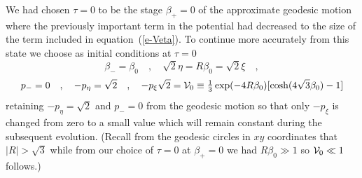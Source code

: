 We had chosen $\tau=0$ to be the stage $\beta_+ = 0$ of the
approximate geodesic motion where the previously important term in the
potential had decreased to the size of the term included in
equation~(\ref{e-Veta}).  To continue more accurately from this state
we choose as initial conditions at $\tau = 0$
$$
   \beta_- = \beta_0 \quad , \quad
   \sqrt{2}\eta = R\beta_0  =  \sqrt{2}\xi  \quad ,
$$
\begin{equation}
   p_- = 0 \quad , \quad -p_\eta = \sqrt{2} \quad , \quad
   -p_\xi \sqrt{2} = {\cal V}_0 \equiv \mbox{$\frac{1}{3}$}
            \exp(-4R\beta_0) [\cosh(4\sqrt{3}\beta_0)-1]
\end{equation}
retaining $-p_\eta = \sqrt{2}$ and $p_- = 0$ from the geodesic motion
so that only $-p_\xi$ is changed from zero to a small value which
will remain constant during the subsequent evolution.  (Recall from
the geodesic circles in $xy$ coordinates that $|R|>\sqrt{3}$ while
from our choice of $\tau = 0$ at $\beta_+ =0$ we had $R\beta_0 \gg
1$ so ${\cal V}_0 \ll 1$ follows.)

